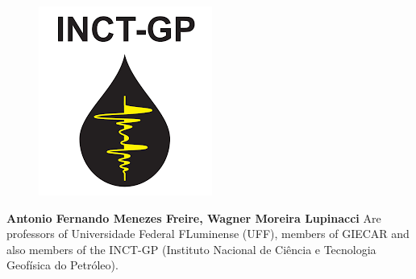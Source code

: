 \documentclass[10pt,twocolumn,twoside]{article}
\begin{document}
\begin{figure}
	\includegraphics[width=1.0\linewidth]{inct-gp.png}
	\vspace{0.03in}
\end{figure}
\textbf{Antonio Fernando Menezes Freire, Wagner Moreira Lupinacci} Are professors of Universidade Federal FLuminense (UFF), members of GIECAR and also members of the INCT-GP (Instituto Nacional de Ciência e Tecnologia Geofísica do Petróleo).
\end{document}
